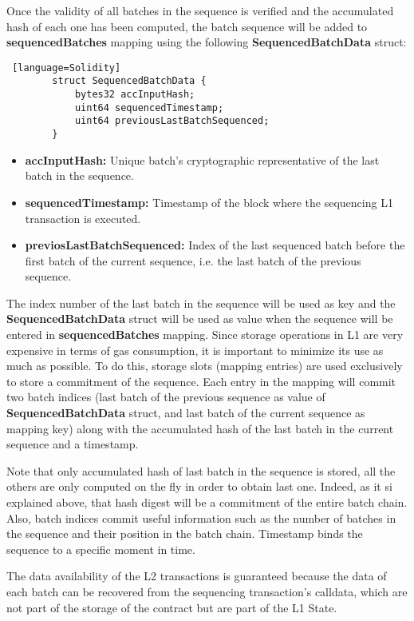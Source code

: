 Once the validity of all batches in the sequence is verified and the accumulated hash of each one has been computed, the batch sequence will be added to \textbf{sequencedBatches} mapping using the following \textbf{SequencedBatchData} struct:

\begin{lstlisting} [language=Solidity]
		struct SequencedBatchData {
			bytes32 accInputHash;
			uint64 sequencedTimestamp;
			uint64 previousLastBatchSequenced;
		}
\end{lstlisting}

\begin{itemize}
	\item \textbf{accInputHash:} Unique batch’s cryptographic representative of the last batch in the sequence.
	\item \textbf{sequencedTimestamp:} Timestamp of the block where the sequencing L1 transaction is executed.
	\item \textbf{previosLastBatchSequenced:} Index of the last sequenced batch before the first batch of the current sequence, i.e. the last batch of the previous sequence.
\end{itemize}

The index number of the last batch in the sequence will be used as key and the \textbf{SequencedBatchData} struct will be used as value when the sequence will be entered in \textbf{sequencedBatches} mapping. Since storage operations in L1 are very expensive in terms of gas consumption, it is important to minimize its use as much as possible. To do this, storage slots (mapping entries) are used exclusively to store a commitment of the sequence. Each entry in the mapping will commit two batch indices (last batch of the previous sequence as value of  \textbf{SequencedBatchData} struct, and last batch of the current sequence as mapping key) along with the accumulated hash of the last batch in the current sequence and a timestamp.

Note that only accumulated hash of last batch in the sequence is stored, all the others are only computed on the fly in order to obtain last one. Indeed, as it si explained above, that hash digest will be a commitment of the entire batch chain. Also, batch indices commit useful information such as the number of batches in the sequence and their position in the batch chain. Timestamp binds the sequence to a specific moment in time.



The data availability of the L2 transactions is guaranteed because the data of each batch can be recovered from the sequencing transaction's calldata, which are not part of the storage of the contract but are part of the L1 State.

